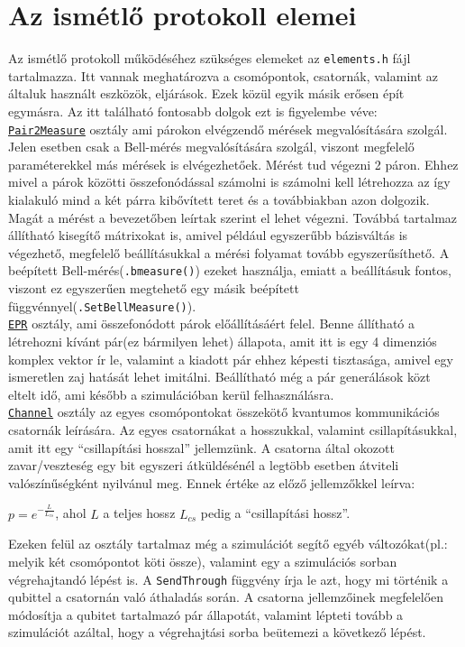 \section{Az ismétlő protokoll elemei }

Az ismétlő protokoll működéséhez szükséges elemeket az \texttt{elements.h} fájl tartalmazza. Itt vannak meghatározva a csomópontok, csatornák, valamint az általuk használt eszközök, eljárások. Ezek közül egyik másik erősen épít egymásra. Az itt található fontosabb dolgok ezt is figyelembe véve:\\
\underline{\texttt{Pair2Measure}} osztály ami párokon elvégzendő mérések megvalósítására szolgál. Jelen esetben csak a Bell-mérés megvalósítására szolgál, viszont megfelelő paraméterekkel más mérések is elvégezhetőek. Mérést tud végezni 2 páron.  Ehhez mivel a párok közötti összefonódással számolni is számolni kell létrehozza az így kialakuló mind a két párra kibővített teret és a továbbiakban azon dolgozik. Magát a mérést a bevezetőben leírtak szerint el lehet végezni. Továbbá tartalmaz állítható kisegítő mátrixokat is, amivel például egyszerűbb bázisváltás is végezhető, megfelelő beállításukkal a mérési folyamat tovább egyszerűsíthető. A beépített Bell-mérés(\texttt{.bmeasure()}) ezeket használja, emiatt a beállításuk fontos, viszont ez egyszerűen megtehető egy másik beépített függvénnyel(\texttt{.SetBellMeasure()}).\\
\underline{\texttt{EPR}} osztály, ami összefonódott párok előállításáért felel. Benne állítható a létrehozni kívánt pár(ez bármilyen lehet) állapota, amit itt is egy 4 dimenziós komplex vektor ír le, valamint a kiadott pár ehhez képesti tisztasága, amivel egy ismeretlen zaj hatását lehet imitálni. Beállítható még a pár generálások közt eltelt idő, ami később a szimulációban kerül felhasználásra.\\
\underline{\texttt{Channel}} osztály az egyes csomópontokat összekötő kvantumos kommunikációs csatornák leírására. Az egyes csatornákat a hosszukkal, valamint csillapításukkal, amit itt egy ``csillapítási hosszal'' jellemzünk. A csatorna által okozott zavar/veszteség egy bit egyszeri átküldésénél a legtöbb esetben átviteli valószínűségként nyilvánul meg. Ennek értéke az előző jellemzőkkel leírva:\\
\begin{center}
$ p=e^{-\frac{L}{L_{cs}}}$, ahol $L$ a teljes hossz $L_{cs}$  pedig a ``csillapítási hossz''.\\
\end{center}
Ezeken felül az osztály tartalmaz még a szimulációt segítő egyéb változókat(pl.: melyik két csomópontot köti össze), valamint egy a szimulációs sorban végrehajtandó lépést is. A \texttt{SendThrough} függvény írja le azt, hogy mi történik a qubittel a csatornán való áthaladás során. A csatorna jellemzőinek megfelelően módosítja a qubitet tartalmazó pár állapotát, valamint lépteti tovább a szimulációt azáltal, hogy a végrehajtási sorba beütemezi a következő lépést.\\
